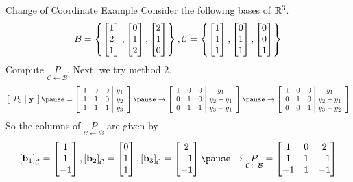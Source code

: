 \documentclass[xcoler=dvipsnames, aspectratio=169]{beamer}
\newcommand{\B}{\mathcal{B}}
\newcommand{\C}{\mathcal{C}}
\begin{document}
    \begin{frame}{Change of Coordinate Example}
        \footnotesize
        Consider the following bases of $\mathbb{R}^3$.
        \[
            \B = \setBasic{\bMat{1\\2\\1}, \bMat{0\\1\\2}, \bMat{2\\1\\0}}, \C = \setBasic{
                \bMat{1\\1\\1}, \bMat{0\\1\\1}, \bMat{0\\0\\1}}
        \]
        Compute $\underset{\C\leftarrow\B}{P}$.
        Next, we try method $2$.\pause
        \[
            \aMat{c|c}{
                P_\C & \vec{y}
            }\pause = \aMat{ccc|c}{
                1 & 0 & 0 & y_1\\
                1 & 1 & 0 & y_2\\
                1 & 1 & 1 & y_3
            }\pause\rightarrow\aMat{ccc|c}{
                1 & 0 & 0 & y_1\\
                0 & 1 & 0 & y_2-y_1\\
                0 & 1 & 1 & y_3-y_1
            }\pause\rightarrow\aMat{ccc|c}{
                1 & 0 & 0 & y_1\\
                0 & 1 & 0 & y_2-y_1\\
                0 & 0 & 1 & y_3-y_2
            }
        \]
        So the columns of $\underset{\C\leftarrow\B}{P}$ are given by
        \[
            \bCoord{\vec{b}_1}{\C} = \bMat{1\\1\\-1}, \bCoord{\vec{b}_2}{\C} = \bMat{0\\1\\1}, 
            \bCoord{\vec{b}_3}{\C} = \bMat{2\\-1\\-1}\pause\rightarrow\underset{\C\leftarrow\B}{P} = \bMat{
                1 & 0 & 2\\
                1 & 1 & -1\\
                -1 & 1 & -1
            }
        \]
    \end{frame}
\end{document}
